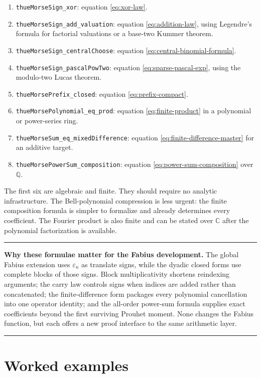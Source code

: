 \documentclass[11pt,oneside]{article}
\theoremstyle{definition}
\theoremstyle{remark}
\newcommand{\C}{\mathbb C}
\newcommand{\Q}{\mathbb Q}
\newenvironment{boxedremark}{%
  \par\smallskip\noindent\begin{center}\begin{minipage}{0.94\textwidth}%
  \color{black}\hrule\vspace{0.6em}\small
}{%
  \vspace{0.6em}\hrule\end{minipage}\end{center}\smallskip
}
\begin{document}
\begin{enumerate}
\item \texttt{thueMorseSign\_xor}: equation \eqref{eq:xor-law}.
\item \texttt{thueMorseSign\_add\_valuation}: equation
      \eqref{eq:addition-law}, using Legendre's formula for factorial
      valuations or a base-two Kummer theorem.
\item \texttt{thueMorseSign\_centralChoose}: equation
      \eqref{eq:central-binomial-formula}.
\item \texttt{thueMorseSign\_pascalPowTwo}: equation
      \eqref{eq:sparse-pascal-exp}, using the modulo-two Lucas theorem.
\item \texttt{thueMorsePrefix\_closed}: equation
      \eqref{eq:prefix-compact}.
\item \texttt{thueMorsePolynomial\_eq\_prod}: equation
      \eqref{eq:finite-product} in a polynomial or power-series ring.
\item \texttt{thueMorseSum\_eq\_mixedDifference}: equation
      \eqref{eq:finite-difference-master} for an additive target.
\item \texttt{thueMorsePowerSum\_composition}: equation
      \eqref{eq:power-sum-composition} over \(\Q\).
\end{enumerate}

The first six are algebraic and finite.  They should require no analytic
infrastructure.  The Bell-polynomial compression is less urgent: the finite
composition formula is simpler to formalize and already determines every
coefficient.  The Fourier product is also finite and can be stated over
\(\C\) after the polynomial factorization is available.

\begin{boxedremark}
\textbf{Why these formulae matter for the Fabius development.}
The global Fabius extension uses \(\varepsilon_n\) as translate signs, while
the dyadic closed forms use complete blocks of those signs.  Block
multiplicativity shortens reindexing arguments; the carry law controls signs
when indices are added rather than concatenated; the finite-difference form
packages every polynomial cancellation into one operator identity; and the
all-order power-sum formula supplies exact coefficients beyond the first
surviving Prouhet moment.  None changes the Fabius function, but each offers a
new proof interface to the same arithmetic layer.
\end{boxedremark}

\section{Worked examples}
\label{sec:examples}
\end{document}
